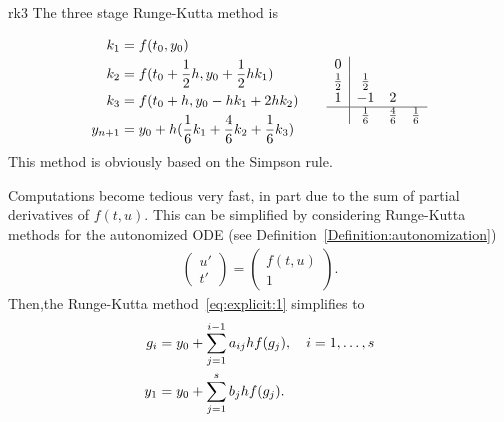 \begin{Example}{rk3}
  The three stage Runge-Kutta method is

  \begin{gather*}
    \begin{aligned}
      k_1 & = f(t_0, y_0) \\
      k_2 & = f(t_0 + \frac12 h, y_0 + \frac12 h k_1) \\
      k_3 & = f(t_0 + h, y_0 - h k_1 + 2 h k_2) \\
      y_{n+1} & = y_0 + h ( \frac16 k_1 + \frac46 k_2 + \frac16 k_3 ) \\
    \end{aligned}
    \qquad
    \begin{array}{c|ccc}
      0 & \\
      \frac12 & \frac12 \\
      1 & -1 & 2 \\
      \hline
        & \frac16 & \frac46 & \frac16 \\
    \end{array}
  \end{gather*}
  This method is obviously based on the Simpson rule.
\end{Example}

\begin{remark}
  Computations become tedious very fast, in part due to the sum of
  partial derivatives of $f(t,u)$. This can be simplified by
  considering Runge-Kutta methods for the autonomized ODE (see
  Definition~\ref{Definition:autonomization})
  \begin{gather*}
    \begin{pmatrix} u' \\ t' \end{pmatrix} = 
    \begin{pmatrix} f(t,u) \\ 1 \end{pmatrix}.
  \end{gather*}
  Then,the Runge-Kutta method~\eqref{eq:explicit:1} simplifies to
  \begin{gather}
    \label{eq:explicit:7a}
    \begin{split}
      g_i &= y_0 +
      \sum_{j=1}^{i-1} a_{ij} h f(g_j),\quad i=1,\dots,s
      \\
      y_1 &= y_0 + \sum_{j=1}^s b_j h f(g_j).
    \end{split}
  \end{gather}
\end{remark}

